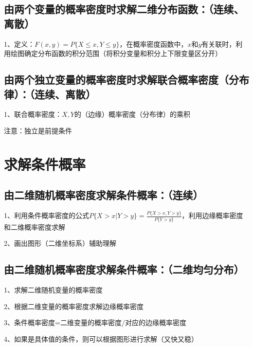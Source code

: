\subsection{由两个变量的概率密度时求解二维分布函数：（连续、离散）}

1、定义：$F(x,y)=P\{ X \le x, Y \le y \}$，在概率密度函数中，$x$和$y$有关联时，利用绘图确定分布函数的积分范围（将积分变量和积分上下限变量区分开）



\subsection{由两个独立变量的概率密度时求解联合概率密度（分布律）：（连续、离散）}

1、联合概率密度：$X,Y$的（边缘）概率密度（分布律）的乘积

注意：独立是前提条件

\section{求解条件概率}



\subsection{由二维随机概率密度求解条件概率：（连续）}

1、利用条件概率密度的公式$P\{X>x|Y>y\} = \frac {P\{X>x,Y>y\}}{P\{Y>y\}}$，利用边缘概率密度和二维概率密度求解

2、画出图形（二维坐标系）辅助理解



\subsection{由二维随机概率密度求解条件概率：（二维均匀分布）}

1、求解二维随机变量的概率密度

2、根据二维变量的概率密度求解边缘概率密度

3、条件概率密度=二维变量的概率密度/对应的边缘概率密度

4、如果是具体值的条件，则可以根据图形进行求解（又快又稳）

